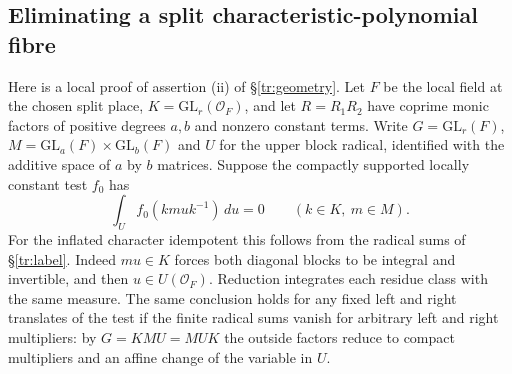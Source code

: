\subsection{Eliminating a split characteristic-polynomial fibre}
\label{tr:parabolic-descent}
Here is a local proof of assertion (ii) of \S\ref{tr:geometry}.
Let $F$ be the local field at the chosen split place, $K=\mathrm{GL}_r(\mathcal O_F)$,
and let $R=R_1R_2$ have coprime monic factors of positive degrees $a,b$
and nonzero constant terms. Write $G=\mathrm{GL}_r(F)$, $M=\mathrm{GL}_a(F)\times
\mathrm{GL}_b(F)$ and $U$ for the upper block radical, identified with
the additive space of $a$ by $b$ matrices. Suppose the compactly supported
locally constant test $f_0$ has
\[
 \int_U f_0(k m u k^{-1})\,du=0\qquad (k\in K,\ m\in M).
\]
For the inflated character idempotent this follows from the radical sums
of \S\ref{tr:label}. Indeed $mu\in K$ forces both diagonal blocks to be
integral and invertible, and then $u\in U(\mathcal O_F)$.
Reduction integrates each residue class with the same measure.
The same conclusion holds for any fixed left and right translates of the
test if the finite radical sums vanish for arbitrary left and right
multipliers: by $G=K M U= M U K$ the outside factors reduce to compact
multipliers and an affine change of the variable in $U$.

